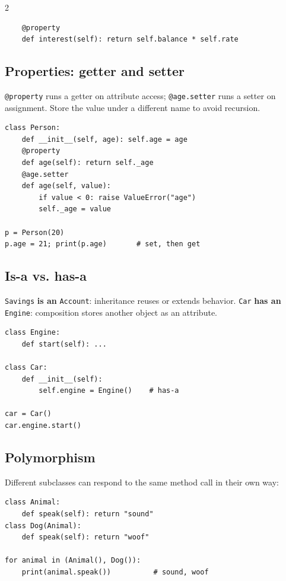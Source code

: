 \documentclass[10pt,a4paper]{article}
\newcommand{\py}[1]{\texttt{#1}}
\begin{document}
\begin{multicols}{2}
\begin{lstlisting}
    @property
    def interest(self): return self.balance * self.rate
\end{lstlisting}

\subsection{Properties: getter and setter}

\py{@property} runs a getter on attribute access; \py{@age.setter} runs a setter on assignment. Store the value under a different name to avoid recursion.

\begin{lstlisting}
class Person:
    def __init__(self, age): self.age = age
    @property
    def age(self): return self._age
    @age.setter
    def age(self, value):
        if value < 0: raise ValueError("age")
        self._age = value

p = Person(20)
p.age = 21; print(p.age)       # set, then get
\end{lstlisting}

\subsection{Is-a vs. has-a}

\py{Savings} \textbf{is an} \py{Account}: inheritance reuses or extends behavior. \py{Car} \textbf{has an} \py{Engine}: composition stores another object as an attribute.

\begin{lstlisting}
class Engine:
    def start(self): ...

class Car:
    def __init__(self):
        self.engine = Engine()    # has-a

car = Car()
car.engine.start()
\end{lstlisting}

\subsection{Polymorphism}

Different subclasses can respond to the same method call in their own way:

\begin{lstlisting}
class Animal:
    def speak(self): return "sound"
class Dog(Animal):
    def speak(self): return "woof"

for animal in (Animal(), Dog()):
    print(animal.speak())          # sound, woof
\end{lstlisting}


\end{multicols}
\end{document}
